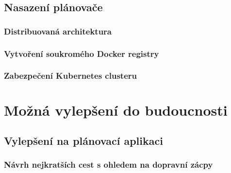 \documentclass[thesis=M,czech]{FITthesis}[2019/12/23]
\theoremstyle{plain}
\theoremstyle{definition}
\begin{document}
\section{Nasazení plánovače}

\subsection{Distribuovaná architektura}








\subsection{Vytvoření soukromého Docker registry}



\subsection{Zabezpečení Kubernetes clusteru}


\chapter{Možná vylepšení do budoucnosti}


\section{Vylepšení na plánovací aplikaci}

\subsection{Návrh nejkratších cest s ohledem na dopravní zácpy}


\end{document}
